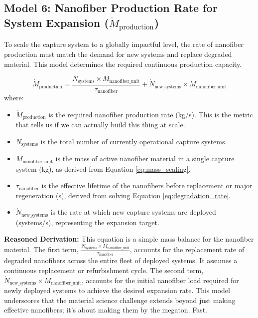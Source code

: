 \documentclass[12pt]{article}
\begin{document}
\subsection*{Model 6: Nanofiber Production Rate for System Expansion (\(\dot{M}_{\text{production}}\))}
To scale the capture system to a globally impactful level, the rate of nanofiber production must match the demand for new systems and replace degraded material. This model determines the required continuous production capacity.

\begin{equation}
\dot{M}_{\text{production}} = \frac{N_{\text{systems}} \times M_{\text{nanofiber\_unit}}}{\tau_{\text{nanofiber}}} + \dot{N}_{\text{new\_systems}} \times M_{\text{nanofiber\_unit}}
\label{eq:production_rate}
\end{equation}
where:
\begin{itemize}
    \item \(\dot{M}_{\text{production}}\) is the required nanofiber production rate (kg/s). This is the metric that tells us if we can actually build this thing at scale.
    \item \(N_{\text{systems}}\) is the total number of currently operational capture systems.
    \item \(M_{\text{nanofiber\_unit}}\) is the mass of active nanofiber material in a single capture system (kg), as derived from Equation \ref{eq:mass_scaling}.
    \item \(\tau_{\text{nanofiber}}\) is the effective lifetime of the nanofibers before replacement or major regeneration (s), derived from solving Equation \ref{eq:degradation_rate}.
    \item \(\dot{N}_{\text{new\_systems}}\) is the rate at which new capture systems are deployed (systems/s), representing the expansion target.
\end{itemize}

\textbf{Reasoned Derivation:} This equation is a simple mass balance for the nanofiber material. The first term, \(\frac{N_{\text{systems}} \times M_{\text{nanofiber\_unit}}}{\tau_{\text{nanofiber}}}\), accounts for the replacement rate of degraded nanofibers across the entire fleet of deployed systems. It assumes a continuous replacement or refurbishment cycle. The second term, \(\dot{N}_{\text{new\_systems}} \times M_{\text{nanofiber\_unit}}\), accounts for the initial nanofiber load required for newly deployed systems to achieve the desired expansion rate. This model underscores that the material science challenge extends beyond just making effective nanofibers; it's about making them by the megaton. Fast.
\end{document}
